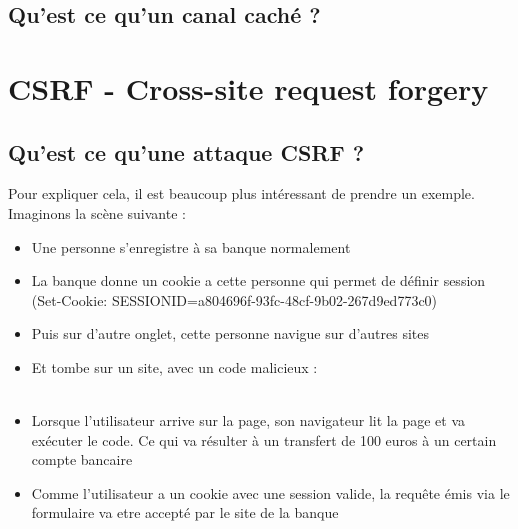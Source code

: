 \documentclass{article}
\begin{document}
\subsection{Qu'est ce qu'un canal caché ?}

\newpage
\section{CSRF - Cross-site request forgery}
\subsection{Qu'est ce qu'une attaque CSRF ?}
Pour expliquer cela, il est beaucoup plus intéressant de prendre un exemple. Imaginons la scène suivante :\\
\begin{itemize}
\item Une personne s'enregistre à sa banque normalement\\
\item La banque donne un cookie a cette personne qui permet de définir session\\
 (Set-Cookie: SESSIONID=a804696f-93fc-48cf-9b02-267d9ed773c0)\\
\item Puis sur d'autre onglet, cette personne navigue sur d'autres sites\\
\item Et tombe sur un site, avec un code malicieux :\\
\\
\item Lorsque l'utilisateur arrive sur la page, son navigateur lit la page et va exécuter le code. Ce qui va résulter à un transfert de 100 euros à un certain compte bancaire\\
\item Comme l'utilisateur a un cookie avec une session valide, la requête émis via le formulaire va etre accepté par le site de la banque
\end{itemize}
\end{document}
